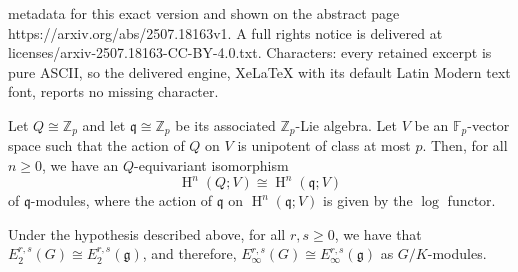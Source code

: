 \documentclass[10pt,a4paper]{amsart}
\DeclareMathOperator{\HH}{H}
\newcommand{\F}{\mathbb{F}}
\newcommand{\Z}{\mathbb{Z}}
\newcommand{\g}{\mathfrak{g}}
\newcommand{\isom}{\cong}
\newcommand{\q}{\mathfrak{q}}
\begin{document}
metadata for this exact version and shown on the abstract page https://arxiv.org/abs/2507.18163v1. A full rights notice is delivered at licenses/arxiv-2507.18163-CC-BY-4.0.txt. Characters: every retained excerpt is pure ASCII, so the delivered engine, XeLaTeX with its default Latin Modern text font, reports no missing character.
		\begin{lemma}\label{lem: abelian} Let $Q\cong \Z_p$ and let $\q\cong \Z_p$ be its associated $\Z_p$-Lie algebra. Let $V$ be an $\F_p$-vector space such that the action of $Q$ on $V$ is unipotent of class at most $p$. Then, for all $n\geq 0$, we have an $Q$-equivariant isomorphism 
		\begin{displaymath}
			\HH^n(Q;V) \isom \HH^n(\q; V)
		\end{displaymath}
		of  $\q$-modules, where the action of $\q$ on $\HH^n(\q; V)$ is given by the $\log$ functor.
	\end{lemma} 

	\begin{theorem}  
		Under the hypothesis described above, for all $r,s\geq 0$, we have that $E^{r,s}_2(G)\cong E_2^{r,s}(\g)$, and therefore, $E^{r,s}_{\infty}(G)\cong E^{r,s}_{\infty}(\g)$ as $G/K$-modules.

	\end{theorem}
\end{document}
